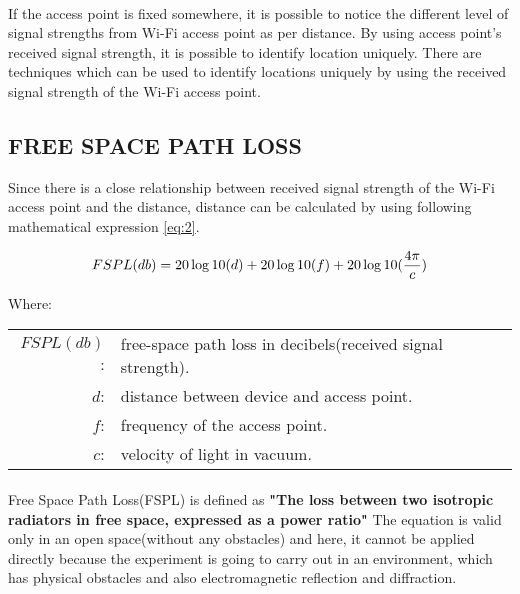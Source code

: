 \paragraph{}
If the access point is fixed somewhere, it is possible to notice the different level of signal strengths from Wi-Fi access point as per distance.
By using access point's received signal strength, it is possible to identify location uniquely. There are techniques which can be used to identify locations uniquely by using the received signal strength of the Wi-Fi access point.


\subsection{FREE SPACE PATH LOSS}
Since there is a close relationship between received signal strength of the Wi-Fi access point and the distance, distance can be calculated by using following mathematical expression \ref{eq:2}.\newline

	\begin{equation}\boldmath\label{eq:2}
		FSPL(db) = 20\log{10}(d)+20\log{10}(f)+20\log{10}(\frac{4\pi}{c})
	\end{equation}\newline
	
	Where:\\
	\hspace*{3em}
	\begin{tabular}{rl}
		$FSPL(db)$:&   free-space path loss in decibels(received signal strength). \\
		$d$:&  distance between device and access point. \\
		$f$:&  frequency of the access point. \\
		$c$:&  velocity of light in vacuum. \\
	\end{tabular}\newline

\paragraph{}
Free Space Path Loss(FSPL) is defined as \textbf{"The loss between two isotropic radiators in free space, expressed as a power ratio"} \cite{FSPL}
The equation is valid only in an open space(without any obstacles) and here, it cannot be applied directly because the experiment is going to carry out in an environment, which has physical obstacles and also electromagnetic reflection and diffraction.\newline

